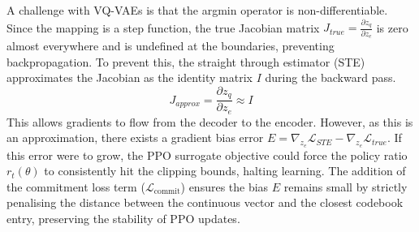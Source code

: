 



A challenge with VQ-VAEs is that the argmin operator is non-differentiable.
Since the mapping is a step function, the true Jacobian matrix $J_{true} = \frac{\partial z_q}{\partial z_e}$ is zero almost everywhere and is undefined at the boundaries, preventing backpropagation.
To prevent this, the straight through estimator (STE) \cite{foundational-ste, STE} approximates the Jacobian as the identity matrix $I$ during the backward pass.
\begin{equation}
    J_{approx} = \frac{\partial z_q}{\partial z_e} \approx I
\end{equation}
This allows gradients to flow from the decoder to the encoder.
However, as this is an approximation, there exists a gradient bias error $E = \nabla_{z_e} \mathcal{L}_{STE} - \nabla_{z_e} \mathcal{L}_{true}$.
If this error were to grow, the PPO surrogate objective could force the policy ratio $r_t(\theta)$ to consistently hit the clipping bounds, halting learning.
The addition of the commitment loss term ($\mathcal{L}_\text{commit}$) ensures the bias $E$ remains small by strictly penalising the distance between the continuous vector and the closest codebook entry, preserving the stability of PPO updates.





